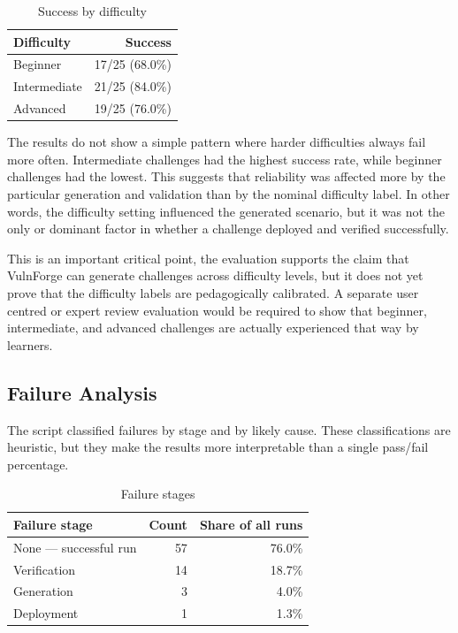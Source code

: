\begin{table}[htbp]
	\centering
	\caption{Success by difficulty}
	\label{tab:results-by-difficulty}
	\begin{tabular}{|p{}|r|}
		\hline
		\textbf{Difficulty} & \textbf{Success} \\
		\hline
		Beginner            & 17/25 (68.0\%)   \\
		\hline
		Intermediate        & 21/25 (84.0\%)   \\
		\hline
		Advanced            & 19/25 (76.0\%)   \\
		\hline
	\end{tabular}
\end{table}

The results do not show a simple pattern where harder difficulties always fail more often. Intermediate challenges had the highest success rate, while beginner challenges had the lowest. This suggests that reliability was affected more by the particular generation and validation than by the nominal difficulty label. In other words, the difficulty setting influenced the generated scenario, but it was not the only or dominant factor in whether a challenge deployed and verified successfully.

This is an important critical point, the evaluation supports the claim that VulnForge can generate challenges across difficulty levels, but it does not yet prove that the difficulty labels are pedagogically calibrated. A separate user centred or expert review evaluation would be required to show that beginner, intermediate, and advanced challenges are actually experienced that way by learners.

\subsection{Failure Analysis}\label{sec:failure-analysis}

The script classified failures by stage and by likely cause. These classifications are heuristic, but they make the results more interpretable than a single pass/fail percentage.

\begin{table}[htbp]
	\centering
	\caption{Failure stages}
	\label{tab:failure-stages}
	\begin{tabular}{|p{}|r|r|}
		\hline
		\textbf{Failure stage}  & \textbf{Count} & \textbf{Share of all runs} \\
		\hline
		None --- successful run & 57             & 76.0\%                     \\
		\hline
		Verification            & 14             & 18.7\%                     \\
		\hline
		Generation              & 3              & 4.0\%                      \\
		\hline
		Deployment              & 1              & 1.3\%                      \\
		\hline
	\end{tabular}
\end{table}

